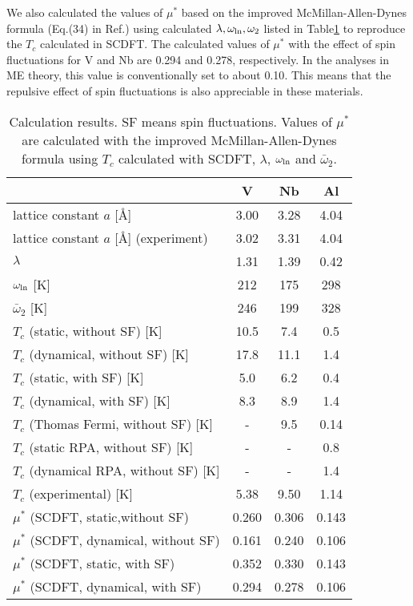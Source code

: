 We also calculated the values of $\mu^{\ast}$ based on the improved McMillan-Allen-Dynes formula 
(Eq.(34) in Ref.\cite{AllenDynes})
using calculated $\lambda, \omega_{\rm ln}, \omega_2$ listed in Table\ref{tab:results} to reproduce 
the $T_c$ calculated in SCDFT. 
The calculated values of $\mu^{\ast}$ with the effect of spin fluctuations for V and Nb are 
0.294 and 0.278, respectively. In the analyses in ME theory, this value is conventionally
set to about 0.10\cite{Carbotte1990}. This means that the repulsive effect of spin fluctuations 
is also appreciable in these materials.
%
\begin{table}[htbp]
	\centering
	\caption{Calculation results. SF means spin fluctuations. Values of $\mu^{\ast}$ are 
	calculated with the improved McMillan-Allen-Dynes formula 
	using $T_c$ calculated with SCDFT, $\lambda$, $\omega_{\rm ln}$ and $\bar{\omega}_2$.} 
	\begin{tabular}{lccc}
		\hline \hline
		& V & Nb & Al \\
		\hline
		lattice constant $a$ [\AA] & 3.00 & 3.28 & 4.04 \\
		lattice constant $a$ [\AA] (experiment) & 3.02\cite{Kuentzler1985} & 3.31\cite{Laesser1985} & 4.04\cite{Sumiyama1990} \\
		\hline
		$\lambda$ & 1.31 & 1.39 & 0.42 \\
		$\omega_{\rm ln}$ [K] & 212 & 175 & 298 \\
		$\bar{\omega}_2$ [K] & 246 & 199 & 328 \\
		\hline
		$T_c$ (static, without SF) [K] & 10.5 & 7.4 & 0.5 \\
		$T_c$ (dynamical, without SF) [K] & 17.8 & 11.1 & 1.4 \\
		$T_c$ (static, with SF) [K] & 5.0 & 6.2 & 0.4 \\
		$T_c$ (dynamical, with SF) [K] & 8.3 & 8.9 & 1.4 \\
		$T_c$ (Thomas Fermi, without SF) [K] & - & 9.5\cite{Luders2005} & 0.14\cite{Luders2005} \\
		$T_c$ (static RPA, without SF) [K] & - & - & 0.8\cite{RA2013} \\
		$T_c$ (dynamical RPA, without SF) [K] & - & - & 1.4\cite{RA2013} \\
		$T_c$ (experimental)\cite{Ashcroft} [K] & 5.38 & 9.50 & 1.14 \\
		\hline
		$\mu^{\ast}$ (SCDFT, static,without SF) & 0.260 & 0.306 & 0.143 \\
		$\mu^{\ast}$ (SCDFT, dynamical, without SF) & 0.161 & 0.240 & 0.106 \\
		$\mu^{\ast}$ (SCDFT, static, with SF) & 0.352 & 0.330 & 0.143 \\
		$\mu^{\ast}$ (SCDFT, dynamical, with SF) & 0.294 & 0.278 & 0.106 \\
		\hline \hline
	\end{tabular}
	\label{tab:results}
\end{table}
%

